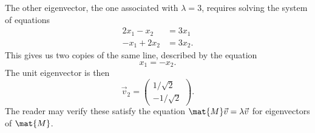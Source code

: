 \begin{example}
The other eigenvector, the one associated with $\lambda=3$, requires
solving the system of equations
\begin{subequations}
  \begin{align}
    2x_{1} -x_{2} &= 3x_{1}\\
    -x_{1} + 2x_{2} &= 3x_{2}.
  \end{align}
\end{subequations}
This gives us two copies of the same line, described by the equation
\begin{equation}
x_{1} = -x_{2}.
\end{equation}
The unit eigenvector is then
\begin{equation}
\vec{v}_{2} = \begin{pmatrix}1/\sqrt{2}\\
-1/\sqrt{2}
\end{pmatrix}.
\end{equation}
The reader may verify these satisfy the equation $\mat{M}\vec{v}=\lambda\vec{v}$
for eigenvectors of $\mat{M}$.
\end{example}